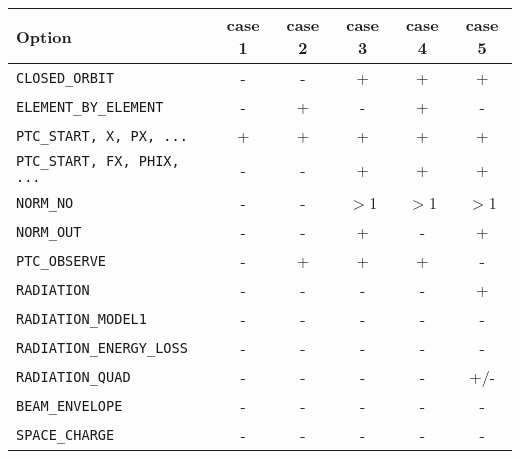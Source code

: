 \begin{tabular}{|lccccc|}
\hline 
\textbf{Option} & \textbf{case 1} & \textbf{case 2} & \textbf{case 3} & \textbf{case 4} & \textbf{case 5 } \\ 
\hline
\texttt{CLOSED\_ORBIT} & - & - & + & + & + \\ 
\hline
\texttt{ELEMENT\_BY\_ELEMENT} & - & + & - & + & - \\ 
\hline
\texttt{PTC\_START, X, PX, ...} & + & + & + & + & + \\ 
\hline
\texttt{PTC\_START, FX, PHIX, ...} & -  & - & + & + & + \\ 
\hline
\texttt{NORM\_NO} & - & - & $>$1 & $>$1 & $>$1 \\ 
\hline
\texttt{NORM\_OUT} & - & - & + & - & + \\ 
\hline
\texttt{PTC\_OBSERVE} & - & + & + & + & - \\ 
\hline
\texttt{RADIATION} & - & - & - & - & + \\ 
\hline
\texttt{RADIATION\_MODEL1} & - & - & - & - & - \\ 
\hline
\texttt{RADIATION\_ENERGY\_LOSS} & - & - & - & - & - \\ 
\hline
\texttt{RADIATION\_QUAD} & - & - & - & - & +/- \\ 
\hline
\texttt{BEAM\_ENVELOPE} & - & - & - & - & - \\ 
\hline
\texttt{SPACE\_CHARGE} & - & - & - & - & - \\ 
\hline
\end{tabular}




